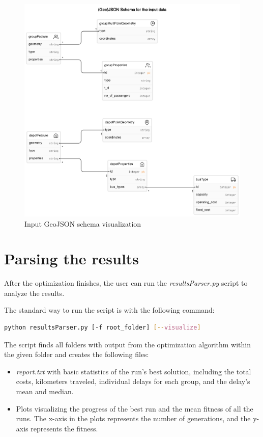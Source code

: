 \begin{figure}
    \centering
    \includegraphics[width=1\linewidth]{img/input_schema_diagram.png}
    \caption{Input GeoJSON schema visualization}
    \label{fig:input_json_schema}
\end{figure}

\section{Parsing the results}

After the optimization finishes, the user can run the \textit{resultsParser.py} script to analyze the results.

The standard way to run the script is with the following command:

\begin{lstlisting}[language=bash]
    python resultsParser.py [-f root_folder] [--visualize]
\end{lstlisting}

The script finds all folders with output from the optimization algorithm within the given folder and creates the following files:

\begin{itemize}
    \setlength\itemsep{0pt}
    \item \textit{report.txt} with basic statistics of the run's best solution, including the total costs, kilometers traveled, individual delays for each group, and the delay's mean and median.
    \item Plots visualizing the progress of the best run and the mean fitness of all the runs. The x-axis in the plots represents the number of generations, and the y-axis represents the fitness.
\end{itemize}

